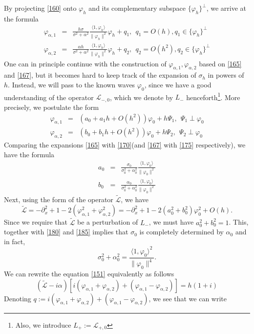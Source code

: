 \documentclass[12pt]{amsart}
\theoremstyle{definition}
\theoremstyle{remark}
\numberwithin{equation}{section}
\renewcommand{\(}{\left(}
\renewcommand{\)}{\right)}
\renewcommand{\[}{\left[}
\renewcommand{\]}{\right]}
\newcommand{\f}[2]{\frac{#1}{#2}}
\newcommand{\cl}{{\mathcal L}}
\newcommand{\al}{\alpha}
\newcommand{\si}{\sigma}
\newcommand{\vp}{\varphi}
\newcommand{\tcl}{\tilde{\cl}}
\newcommand{\dpr}[2]{\langle #1,#2 \rangle}
\newcommand{\p}{\partial}
\begin{document}
   By projecting \eqref{160}  onto $\vp_h$ and its complementary subspace  $\{\vp_h\}^\perp$, we arrive at the formula
 \begin{eqnarray}
 \label{165}
 \vp_{\al,1} &=& \f{h \si}{\si^2+\al^2} \f{\dpr{1}{\vp_h}}{\|\vp_h\|^2} \vp_h+q_1, \ \ q_1=O(h), q_1 \in \{\vp_h\}^\perp \\
 \label{167}
  \vp_{\al,2} &=& \f{\al h}{\si^2+\al^2} \f{\dpr{1}{\vp_h}}{\|\vp_h\|^2} \vp_h+q_2, \ \ q_2=O(h^2), q_2 \in \{\vp_h\}^\perp
 \end{eqnarray}
 One can in principle continue with the construction of $\vp_{\al,1}, \vp_{\al,2}$ based on \eqref{165} and
 \eqref{167}, but it becomes hard to keep track of the expansion of $\si_h$ in powers of $h$. Instead, we will pass to the known waves $\vp_0$, since we have a good understanding  of the operator $\cl_{-,0}$, which we denote by $L_{-}$ henceforth\footnote{Also, we introduce $L_+:=\cl_{+,0}$}. More precisely, we postulate the form
 \begin{eqnarray}
 \label{170}
 \vp_{\al,1} &=& (a_0+a_1 h+O(h^2))\vp_0+ h \Psi_1, \ \ \Psi_1\perp \vp_0  \\
 \label{175}
  \vp_{\al,2} &=& (b_0+b_1 h+O(h^2))\vp_0+ h \Psi_2,  \ \ \Psi_2\perp \vp_0
 \end{eqnarray}
 Comparing the expansions \eqref{165} with \eqref{170}(and \eqref{167} with \eqref{175} respectively), we have the formula
 \begin{eqnarray}
 \label{180}
  a_0 &=& \f{\si_0}{\si_0^2+\al_0^2} \f{\dpr{1}{\vp_0}}{\|\vp_0\|^2}  \\
 \label{185}
 b_0 &=& \f{\al_0}{\si_0^2+\al_0^2} \f{\dpr{1}{\vp_0}}{\|\vp_0\|^2}
\end{eqnarray}
 Next, using the form of the operator $\tcl$, we have
 $$
 \tcl=-\p_x^2+1 - 2(\vp_{\al,1}^2+\vp_{\al,2}^2)= -\p_x^2+1 - 2(a_0^2+b_0^2)\vp_0^2+O(h).
 $$
 Since we require that $\tcl$ be a perturbation of $L_-$, we must have $a_0^2+b_0^2=1$. This, together with \eqref{180} and \eqref{185} implies that $\si_0$ is completely determined by $\al_0$ and in fact,
 \begin{equation}
 \label{211}
 \si_0^2+\al_0^2=\f{\dpr{1}{\vp_0}^2}{\|\vp_0\|^4}.
 \end{equation}
 We can rewrite the equation \eqref{151} equivalently as follows
 \begin{equation}
 \label{190}
 (\tcl-i\al)[i (\vp_{\al,1}+\vp_{\al,2})+(\vp_{\al,1}-\vp_{\al,2})]=h(1+i)
 \end{equation}
 Denoting $q:=i(\vp_{\al,1}+\vp_{\al,2})+(\vp_{\al,1}-\vp_{\al,2})$, we see that we can write
\end{document}
